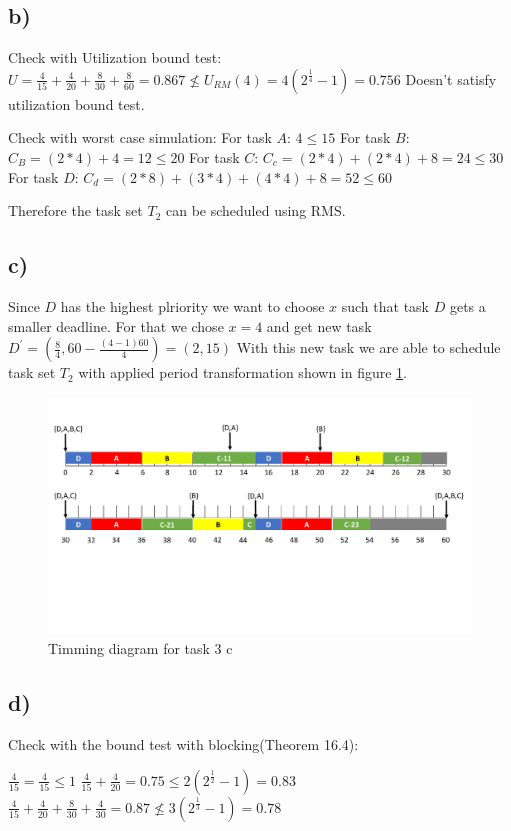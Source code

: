 \documentclass[10pt,a4paper]{article}
\begin{document}
\subsection*{b)}
Check with Utilization bound test:
\newline
$U = \frac{4}{15} + \frac{4}{20} + \frac{8}{30} + \frac{8}{60} = 0.867 \nleq U_{RM}(4) = 4(2^{\frac{1}{4}} - 1) = 0.756$
Doesn't satisfy  utilization bound test.

Check with worst case simulation:
\newline
For task $A$: $4 \leq 15$
\newline
For task $B$: $C_B = (2 * 4) + 4 = 12 \leq 20$
\newline
For task $C$: $C_c = (2 * 4) + (2 * 4) + 8 = 24 \leq 30$
\newline
For task $D$: $C_d = (2 * 8) + (3 * 4) + (4 * 4) + 8 = 52 \leq 60$

Therefore the task set $T_2$ can be scheduled using RMS.

\subsection*{c)}
Since $D$ has the highest plriority we want to choose $x$ such that task $D$ gets a smaller deadline. 
For that we chose $x=4$ and get new task $D^\prime = (\frac{8}{4}, 60 - \frac{(4 - 1)60}{4}) = (2, 15)$
With this new task we are able to schedule task set $T_2$ with applied period transformation shown in figure \ref{fig:3c}.


\begin{figure}[!h]
\includegraphics[width=\linewidth]{3c.pdf}
\caption{Timming diagram for task 3 c}
\label{fig:3c}
\end{figure}

\subsection*{d)}
Check with the bound test with blocking(Theorem 16.4\cite{Fan:2015:RES:2800613}):

$\frac{4}{15} = \frac{4}{15} \leq 1$
\newline
$\frac{4}{15} + \frac{4}{20} = 0.75 \leq 2(2^{\frac{1}{2}} - 1) = 0.83 $
\newline
$\frac{4}{15} + \frac{4}{20} + \frac{8}{30} + \frac{4}{30} = 0.87 \nleq 3(2^{\frac{1}{3}} - 1) = 0.78$



\end{document}
